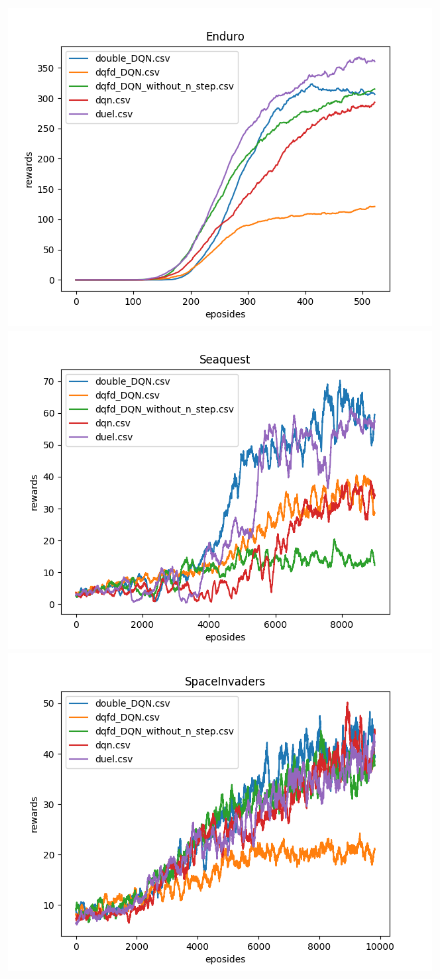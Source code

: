 \documentclass{article}
\begin{document}
\begin{figure}

\includegraphics[scale=0.5]{../poster/figures/Enduro.png}
\includegraphics[scale=0.5]{../poster/figures/Seaquest.png}\\
\includegraphics[scale=0.5]{../poster/figures/SpaceInvaders.png}


\end{figure}
\end{document}
